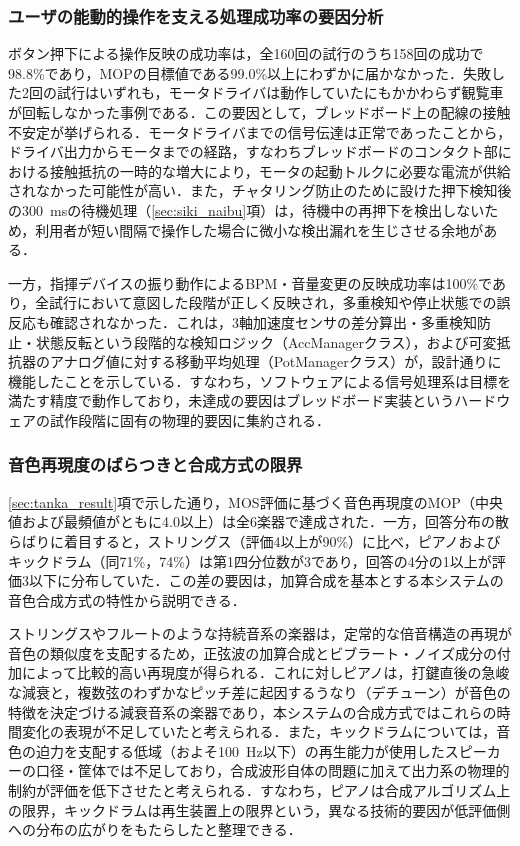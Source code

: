 \subsubsection{ユーザの能動的操作を支える処理成功率の要因分析}
\label{sec:kousatsu_sousa}

ボタン押下による操作反映の成功率は，全160回の試行のうち158回の成功で98.8\%であり，MOPの目標値である99.0\%以上にわずかに届かなかった．失敗した2回の試行はいずれも，モータドライバは動作していたにもかかわらず観覧車が回転しなかった事例である．この要因として，ブレッドボード上の配線の接触不安定が挙げられる．モータドライバまでの信号伝達は正常であったことから，ドライバ出力からモータまでの経路，すなわちブレッドボードのコンタクト部における接触抵抗の一時的な増大により，モータの起動トルクに必要な電流が供給されなかった可能性が高い．また，チャタリング防止のために設けた押下検知後の\SI{300}{ms}の待機処理（\ref{sec:siki_naibu}項）は，待機中の再押下を検出しないため，利用者が短い間隔で操作した場合に微小な検出漏れを生じさせる余地がある．

一方，指揮デバイスの振り動作によるBPM・音量変更の反映成功率は100\%であり，全試行において意図した段階が正しく反映され，多重検知や停止状態での誤反応も確認されなかった．これは，3軸加速度センサの差分算出・多重検知防止・状態反転という段階的な検知ロジック（AccManagerクラス），および可変抵抗器のアナログ値に対する移動平均処理（PotManagerクラス）が，設計通りに機能したことを示している．すなわち，ソフトウェアによる信号処理系は目標を満たす精度で動作しており，未達成の要因はブレッドボード実装というハードウェアの試作段階に固有の物理的要因に集約される．

\subsubsection{音色再現度のばらつきと合成方式の限界}
\label{sec:kousatsu_onshoku}

\ref{sec:tanka_result}項で示した通り，MOS評価に基づく音色再現度のMOP（中央値および最頻値がともに4.0以上）は全6楽器で達成された．一方，回答分布の散らばりに着目すると，ストリングス（評価4以上が90\%）に比べ，ピアノおよびキックドラム（同71\%，74\%）は第1四分位数が3であり，回答の4分の1以上が評価3以下に分布していた．この差の要因は，加算合成を基本とする本システムの音色合成方式の特性から説明できる．

ストリングスやフルートのような持続音系の楽器は，定常的な倍音構造の再現が音色の類似度を支配するため，正弦波の加算合成とビブラート・ノイズ成分の付加によって比較的高い再現度が得られる．これに対しピアノは，打鍵直後の急峻な減衰と，複数弦のわずかなピッチ差に起因するうなり（デチューン）が音色の特徴を決定づける減衰音系の楽器であり，本システムの合成方式ではこれらの時間変化の表現が不足していたと考えられる．また，キックドラムについては，音色の迫力を支配する低域（およそ\SI{100}{Hz}以下）の再生能力が使用したスピーカーの口径・筐体では不足しており，合成波形自体の問題に加えて出力系の物理的制約が評価を低下させたと考えられる．すなわち，ピアノは合成アルゴリズム上の限界，キックドラムは再生装置上の限界という，異なる技術的要因が低評価側への分布の広がりをもたらしたと整理できる．

